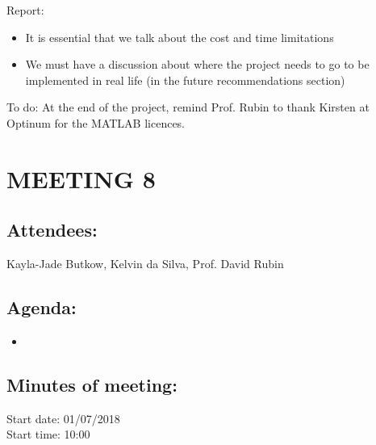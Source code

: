 \documentclass[10pt,onecolumn]{witseiepaper}
\begin{document}
Report:
\begin{itemize}
	\item It is essential that we talk about the cost and time limitations
	\item We must have a discussion about where the project needs to go to be implemented in real life (in the future recommendations section)
\end{itemize}

To do:
At the end of the project, remind Prof. Rubin to thank Kirsten at Optinum for the MATLAB licences.

\section*{MEETING 8}
\subsection*{Attendees:}
Kayla-Jade Butkow, Kelvin da Silva, Prof. David Rubin
\subsection*{Agenda:} 
\begin{itemize}
	\item 
\end{itemize}

\subsection*{Minutes of meeting:}
Start date: 01/07/2018 \\
Start time: 10:00
\end{document}
